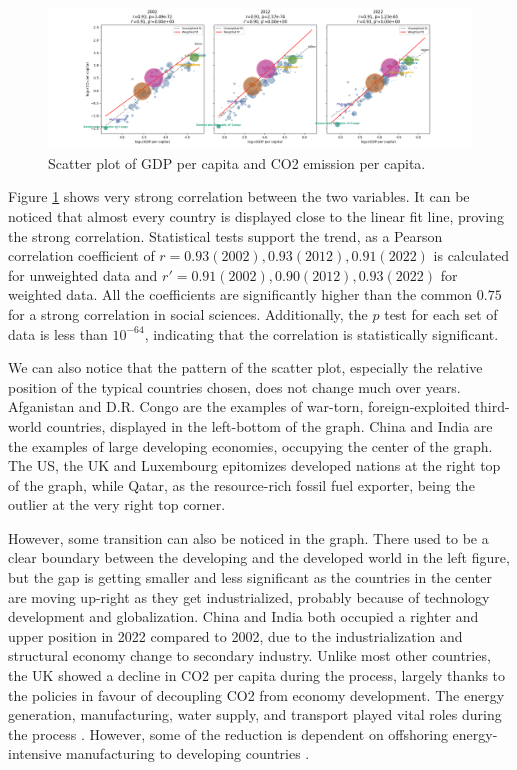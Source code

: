 \documentclass[a4paper]{article}
\begin{document}
\begin{figure}[ht!]
    \centering
    \caption{Scatter plot of GDP per capita and CO2 emission per capita.}
    \label{fig.horizontal}
    \includegraphics[width = \textwidth]{data/horizontal.png}
\end{figure}

Figure \ref{fig.horizontal} shows very strong correlation between the two variables. It can be noticed that almost every country is displayed close to the linear fit line, proving the strong correlation. Statistical tests support the trend, as a Pearson correlation coefficient of $r = 0.93 (2002), 0.93 (2012), 0.91 (2022)$ is calculated for unweighted data and $r' = 0.91 (2002), 0.90 (2012), 0.93 (2022)$ for weighted data. All the coefficients are significantly higher than the common $0.75$ for a strong correlation in social sciences. Additionally, the $p$ test for each set of data is less than $10^{-64}$, indicating that the correlation is statistically significant.

We can also notice that the pattern of the scatter plot, especially the relative position of the typical countries chosen, does not change much over years. Afganistan and D.R. Congo are the examples of war-torn, foreign-exploited third-world countries, displayed in the left-bottom of the graph. China and India are the examples of large developing economies, occupying the center of the graph. The US, the UK and Luxembourg epitomizes developed nations at the right top of the graph, while Qatar, as the resource-rich fossil fuel exporter, being the outlier at the very right top corner. 

However, some transition can also be noticed in the graph. There used to be a clear boundary between the developing and the developed world in the left figure, but the gap is getting smaller and less significant as the countries in the center are moving up-right as they get industrialized, probably because of technology development and globalization. China and India both occupied a righter and upper position in 2022 compared to 2002, due to the industrialization and structural economy change to secondary industry. Unlike most other countries, the UK showed a decline in CO2 per capita during the process, largely thanks to the policies in favour of decoupling CO2 from economy development. The energy generation, manufacturing, water supply, and transport played vital roles during the process \cite{noco2gdpuk}. However, some of the reduction is dependent on offshoring energy-intensive manufacturing to developing countries \cite{peters2011growth}. 
\end{document}
